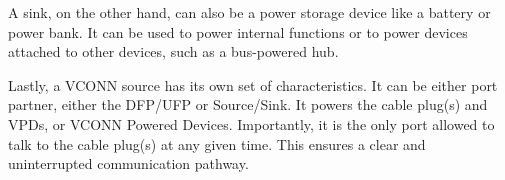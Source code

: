 A sink, on the other hand, can also be a power storage device like a battery or power bank. It can be used to power internal functions or to power devices attached to other devices, such as a bus-powered hub.

Lastly, a VCONN source has its own set of characteristics. It can be either port partner, either the DFP/UFP or Source/Sink. It powers the cable plug(s) and VPDs, or VCONN Powered Devices. Importantly, it is the only port allowed to talk to the cable plug(s) at any given time. This ensures a clear and uninterrupted communication pathway.
\vspace{3cm}
 